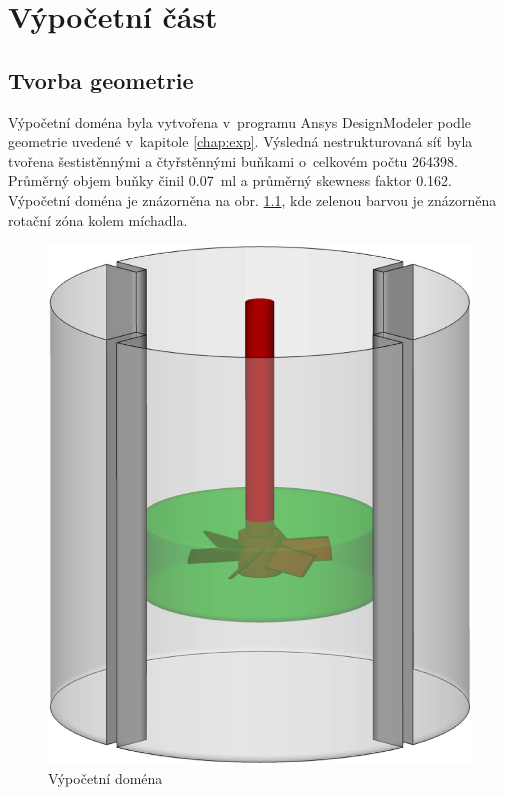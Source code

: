 \chapter{Výpočetní část}

\section{Tvorba geometrie}

Výpočetní doména byla vytvořena v~programu Ansys DesignModeler podle geometrie uvedené v~kapitole \ref{chap:exp}. Výsledná nestrukturovaná síť byla tvořena šestistěnnými a čtyřstěnnými buňkami o~celkovém počtu \num{264398}. Průměrný objem buňky činil \SI{0.07}{\milli\litre} a průměrný skewness faktor \num{0.162}. Výpočetní doména je znázorněna na obr. \ref{fig:geo}, kde zelenou barvou je znázorněna rotační zóna kolem míchadla. 

\begin{figure}[h!]
\begin{center}
\includegraphics[scale=0.28]{images/geo.eps}
\caption{Výpočetní doména}
\label{fig:geo}
\end{center}
\end{figure} 

